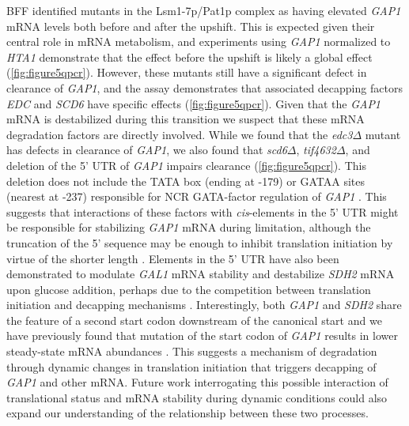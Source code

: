 BFF identified mutants in the Lsm1-7p/Pat1p
complex as having elevated \textit{GAP1} mRNA levels both before and after the
upshift. This is expected given their central role in mRNA 
metabolism, and experiments using \textit{GAP1} normalized to
\textit{HTA1} demonstrate that the effect before the upshift is
likely a global effect (\autoref{fig:figure5qpcr}). 
However, these mutants still have a
significant defect in clearance of \textit{GAP1},
and the assay demonstrates that associated decapping factors 
\textit{EDC} and \textit{SCD6} have specific effects
(\autoref{fig:figure5qpcr}).
Given that the \textit{GAP1} mRNA is destabilized during this
transition we suspect that these mRNA degradation factors are
directly involved. 
While we found that the \textit{edc3}$\Delta$ mutant has defects in
clearance of \textit{GAP1}, we also 
found that \textit{scd6}$\Delta$,
\textit{tif4632}$\Delta$, and deletion of the 5' UTR
of \textit{GAP1} impairs clearance (\autoref{fig:figure5qpcr}). 
This deletion does not include the TATA box (ending at -179) or
GATAA sites (nearest at -237) responsible for NCR GATA-factor
regulation of \textit{GAP1} \parencite{stanbrough1996two}.
This suggests that interactions of
these factors with \textit{cis}-elements in the 5' UTR might be responsible for
stabilizing \textit{GAP1} mRNA during limitation, although the 
truncation of the 5' sequence may be enough to inhibit translation 
initiation by virtue of the shorter length
\parencite{arribere2013roles}.
Elements in the 5' UTR have
also been demonstrated to modulate \textit{GAL1} mRNA stability
\parencite{baumgartner2011antagonistic} and destabilize \textit{SDH2} mRNA upon glucose
addition, perhaps due to the competition between translation
initiation and decapping mechanisms \parencite{de2002role}.
Interestingly, both \textit{GAP1} and \textit{SDH2} 
share the feature of a second start
codon downstream of the canonical start
\parencite{neymotin2016multiple} and
we have previously found that mutation of
the start codon of \textit{GAP1} results in lower
steady-state mRNA abundances \parencite{neymotin2016multiple}.
This
suggests a mechanism of degradation through dynamic changes in 
translation initiation that triggers decapping of \textit{GAP1} 
and other mRNA. 
Future work interrogating
this possible interaction of translational status and mRNA
stability during dynamic conditions could also expand our understanding of
the relationship between these two processes.

